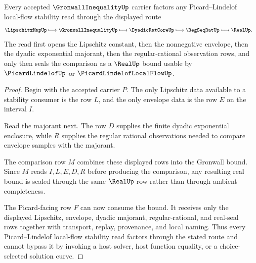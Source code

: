 \begin{theorem}
\label{thm:gronwall-inequality-picard-handoff}
Every accepted $\GronwallInequalityUp$ carrier factors any Picard--Lindelof local-flow stability read through the displayed route
$$
\LipschitzMapUp \longmapsto \GronwallInequalityUp \longmapsto \DyadicRatCoreUp \longmapsto \RegSeqRatUp \longmapsto \RealUp.
$$
The read first opens the Lipschitz constant, then the nonnegative envelope, then the dyadic exponential majorant, then the regular-rational observation rows, and only then seals the comparison as a $\RealUp$ bound usable by $\PicardLindelofUp$ or $\PicardLindelofLocalFlowUp$.
\end{theorem}
\begin{proof}
Begin with the accepted carrier $P$. The only Lipschitz data available to a stability consumer is the row $L$, and the only envelope data is the row $E$ on the interval $I$.

Read the majorant next. The row $D$ supplies the finite dyadic exponential enclosure, while $R$ supplies the regular rational observations needed to compare envelope samples with the majorant.

The comparison row $M$ combines these displayed rows into the Gronwall bound. Since $M$ reads $I,L,E,D,R$ before producing the comparison, any resulting real bound is sealed through the same $\RealUp$ row rather than through ambient completeness.

The Picard-facing row $F$ can now consume the bound. It receives only the displayed Lipschitz, envelope, dyadic majorant, regular-rational, and real-seal rows together with transport, replay, provenance, and local naming. Thus every Picard--Lindelof local-flow stability read factors through the stated route and cannot bypass it by invoking a host solver, host function equality, or a choice-selected solution curve.
\end{proof}

